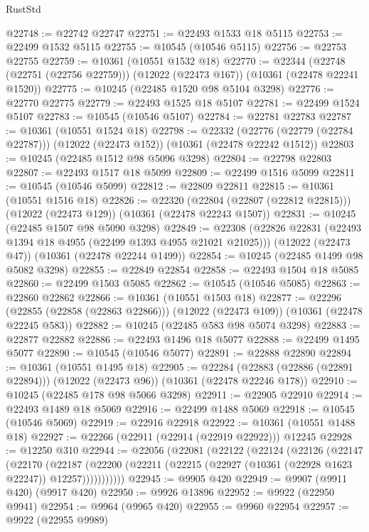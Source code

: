 \begin{lexlean}{RustStd}
\begin{coremodule}
@22748 := @22742 @22747
@22751 := @22493 @1533 @18 @5115
@22753 := @22499 @1532 @5115
@22755 := @10545 (@10546 @5115)
@22756 := @22753 @22755
@22759 := @10361 (@10551 @1532 @18)
@22770 := @22344
    (@22748 (@22751 (@22756 @22759)))
    (@12022 (@22473 @167))
    (@10361 (@22478 @22241 @1520))
@22775 := @10245 (@22485 @1520 @98 @5104 @3298)
@22776 := @22770 @22775
@22779 := @22493 @1525 @18 @5107
@22781 := @22499 @1524 @5107
@22783 := @10545 (@10546 @5107)
@22784 := @22781 @22783
@22787 := @10361 (@10551 @1524 @18)
@22798 := @22332
    (@22776 (@22779 (@22784 @22787)))
    (@12022 (@22473 @152))
    (@10361 (@22478 @22242 @1512))
@22803 := @10245 (@22485 @1512 @98 @5096 @3298)
@22804 := @22798 @22803
@22807 := @22493 @1517 @18 @5099
@22809 := @22499 @1516 @5099
@22811 := @10545 (@10546 @5099)
@22812 := @22809 @22811
@22815 := @10361 (@10551 @1516 @18)
@22826 := @22320
    (@22804 (@22807 (@22812 @22815)))
    (@12022 (@22473 @129))
    (@10361 (@22478 @22243 @1507))
@22831 := @10245 (@22485 @1507 @98 @5090 @3298)
@22849 := @22308
    (@22826 @22831 (@22493 @1394 @18 @4955 (@22499 @1393 @4955 @21021 @21025)))
    (@12022 (@22473 @47))
    (@10361 (@22478 @22244 @1499))
@22854 := @10245 (@22485 @1499 @98 @5082 @3298)
@22855 := @22849 @22854
@22858 := @22493 @1504 @18 @5085
@22860 := @22499 @1503 @5085
@22862 := @10545 (@10546 @5085)
@22863 := @22860 @22862
@22866 := @10361 (@10551 @1503 @18)
@22877 := @22296
    (@22855 (@22858 (@22863 @22866)))
    (@12022 (@22473 @109))
    (@10361 (@22478 @22245 @583))
@22882 := @10245 (@22485 @583 @98 @5074 @3298)
@22883 := @22877 @22882
@22886 := @22493 @1496 @18 @5077
@22888 := @22499 @1495 @5077
@22890 := @10545 (@10546 @5077)
@22891 := @22888 @22890
@22894 := @10361 (@10551 @1495 @18)
@22905 := @22284
    (@22883 (@22886 (@22891 @22894)))
    (@12022 (@22473 @96))
    (@10361 (@22478 @22246 @178))
@22910 := @10245 (@22485 @178 @98 @5066 @3298)
@22911 := @22905 @22910
@22914 := @22493 @1489 @18 @5069
@22916 := @22499 @1488 @5069
@22918 := @10545 (@10546 @5069)
@22919 := @22916 @22918
@22922 := @10361 (@10551 @1488 @18)
@22927 := @22266 (@22911 (@22914 (@22919 @22922))) @12245
@22928 := @12250 @310
@22944 := @22056
    (@22081
      (@22122
        (@22124
          (@22126
            (@22147
              (@22170
                (@22187
                  (@22200 (@22211 (@22215 (@22927 (@10361 (@22928 @1623 @22247)) @12257)))))))))))
@22945 := @9905 @420
@22949 := @9907 (@9911 @420) (@9917 @420)
@22950 := @9926 @13896
@22952 := @9922 (@22950 @9941)
@22954 := @9964 (@9965 @420)
@22955 := @9960 @22954
@22957 := @9922 (@22955 @9989)

\end{coremodule}
\end{lexlean}
